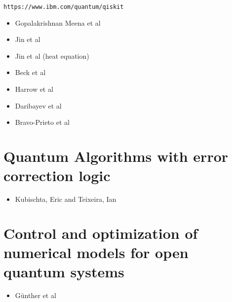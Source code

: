 \documentclass[]{article}
\begin{document}
\verb=https://www.ibm.com/quantum/qiskit=
\begin{comment}
pip3 install qiskit
python3 -m venv venv_sussman
source venv_sussman/bin/activate
python3 -m pip install qiskit
pip3 install qiskit-aer
pip3 install matplotlib
python3 hadamard_gate.py
\end{comment}

\begin{itemize}
\item Gopalakrishnan Meena et al\cite{gopalakrishnan2024solving}
\item Jin et al\cite{doi:10.1137/23M1563451}
\item Jin et al (heat equation)\cite{jin2024quantum}
\item Beck et al\cite{beck2024integrating}
\item Harrow et al\cite{harrow2009quantum}
\item Daribayev et al\cite{daribayev2023implementation}
\item Bravo-Prieto et al\cite{bravo2023variational}
\end{itemize}

\section{Quantum Algorithms with error correction logic}

\begin{itemize}
\item Kubischta, Eric and Teixeira, Ian\cite{kubischta2023family}
\end{itemize}

\section{Control and optimization of numerical models for open
  quantum systems}

\begin{itemize}
\item Günther et al\cite{9651392}
\end{itemize}
\end{document}
